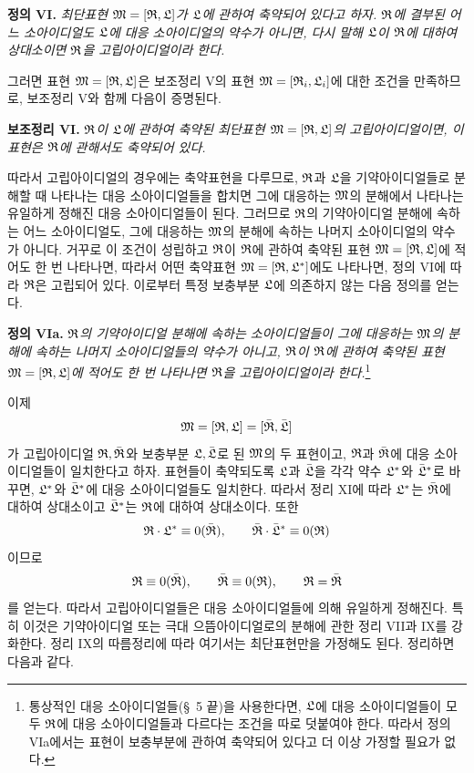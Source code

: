 \textbf{정의 VI.} \emph{최단표현 $\mathfrak{M}=[\mathfrak{R},\mathfrak{L}]$가 $\mathfrak{L}$에 관하여 축약되어 있다고 하자. $\mathfrak{R}$에 결부된 어느 소아이디얼도 $\mathfrak{L}$에 대응 소아이디얼의 약수가 아니면, 다시 말해 $\mathfrak{L}$이 $\mathfrak{R}$에 대하여 상대소이면 $\mathfrak{R}$을 고립아이디얼이라 한다.}

그러면 표현 $\mathfrak{M}=[\mathfrak{R},\mathfrak{L}]$은 보조정리 V의 표현 $\mathfrak{M}=[\mathfrak{R}_i,\mathfrak{L}_i]$에 대한 조건을 만족하므로, 보조정리 V와 함께 다음이 증명된다.

\textbf{보조정리 VI.} \emph{$\mathfrak{R}$이 $\mathfrak{L}$에 관하여 축약된 최단표현 $\mathfrak{M}=[\mathfrak{R},\mathfrak{L}]$의 고립아이디얼이면, 이 표현은 $\mathfrak{R}$에 관해서도 축약되어 있다.}

따라서 고립아이디얼의 경우에는 축약표현을 다루므로, $\mathfrak{R}$과 $\mathfrak{L}$을 기약아이디얼들로 분해할 때 나타나는 대응 소아이디얼들을 합치면 그에 대응하는 $\mathfrak{M}$의 분해에서 나타나는 유일하게 정해진 대응 소아이디얼들이 된다. 그러므로 $\mathfrak{R}$의 기약아이디얼 분해에 속하는 어느 소아이디얼도, 그에 대응하는 $\mathfrak{M}$의 분해에 속하는 나머지 소아이디얼의 약수가 아니다. 거꾸로 이 조건이 성립하고 $\mathfrak{R}$이 $\mathfrak{R}$에 관하여 축약된 표현 $\mathfrak{M}=[\mathfrak{R},\mathfrak{L}]$에 적어도 한 번 나타나면, 따라서 어떤 축약표현 $\mathfrak{M}=[\mathfrak{R},\mathfrak{L}^*]$에도 나타나면, 정의 VI에 따라 $\mathfrak{R}$은 고립되어 있다. 이로부터 특정 보충부분 $\mathfrak{L}$에 의존하지 않는 다음 정의를 얻는다.

\textbf{정의 VIa.} \emph{$\mathfrak{R}$의 기약아이디얼 분해에 속하는 소아이디얼들이 그에 대응하는 $\mathfrak{M}$의 분해에 속하는 나머지 소아이디얼들의 약수가 아니고, $\mathfrak{R}$이 $\mathfrak{R}$에 관하여 축약된 표현 $\mathfrak{M}=[\mathfrak{R},\mathfrak{L}]$에 적어도 한 번 나타나면 $\mathfrak{R}$을 고립아이디얼이라 한다.}\footnote{통상적인 대응 소아이디얼들(\S~5 끝)을 사용한다면, $\mathfrak{L}$에 대응 소아이디얼들이 모두 $\mathfrak{R}$에 대응 소아이디얼들과 다르다는 조건을 따로 덧붙여야 한다. 따라서 정의 VIa에서는 표현이 보충부분에 관하여 축약되어 있다고 더 이상 가정할 필요가 없다.}

이제
\[
 \mathfrak{M}=[\mathfrak{R},\mathfrak{L}]=[\bar{\mathfrak{R}},\bar{\mathfrak{L}}]
\]
가 고립아이디얼 $\mathfrak{R},\bar{\mathfrak{R}}$와 보충부분 $\mathfrak{L},\bar{\mathfrak{L}}$로 된 $\mathfrak{M}$의 두 표현이고, $\mathfrak{R}$과 $\bar{\mathfrak{R}}$에 대응 소아이디얼들이 일치한다고 하자. 표현들이 축약되도록 $\mathfrak{L}$과 $\bar{\mathfrak{L}}$을 각각 약수 $\mathfrak{L}^*$와 $\bar{\mathfrak{L}}^{*}$로 바꾸면, $\mathfrak{L}^*$와 $\bar{\mathfrak{L}}^{*}$에 대응 소아이디얼들도 일치한다. 따라서 정리 XI에 따라 $\mathfrak{L}^*$는 $\bar{\mathfrak{R}}$에 대하여 상대소이고 $\bar{\mathfrak{L}}^{*}$는 $\mathfrak{R}$에 대하여 상대소이다. 또한
\[
 \mathfrak{R}\cdot\mathfrak{L}^*\equiv0(\bar{\mathfrak{R}}),
 \qquad
 \bar{\mathfrak{R}}\cdot\bar{\mathfrak{L}}^{*}\equiv0(\mathfrak{R})
\]
이므로
\[
 \mathfrak{R}\equiv0(\bar{\mathfrak{R}}),
 \qquad
 \bar{\mathfrak{R}}\equiv0(\mathfrak{R}),
 \qquad
 \mathfrak{R}=\bar{\mathfrak{R}}
\]
를 얻는다. 따라서 고립아이디얼들은 대응 소아이디얼들에 의해 유일하게 정해진다. 특히 이것은 기약아이디얼 또는 극대 으뜸아이디얼로의 분해에 관한 정리 VII과 IX를 강화한다. 정리 IX의 따름정리에 따라 여기서는 최단표현만을 가정해도 된다. 정리하면 다음과 같다.

